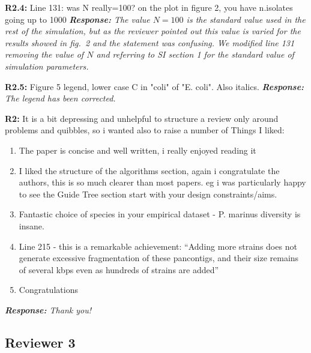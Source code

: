 \documentclass[aps,rmp,onecolumn]{revtex4-1}
\newcommand{\Marco}[1]{{\color{orange}Marco: #1}}
\newcommand{\reviewer}[2]{\textbf{#1:} #2\vskip 5mm}
\newcommand{\response}[1]{{\it {\color{response}\textbf{Response:} #1}}\vskip 5mm}
\begin{document}
\reviewer{R2.4}{Line 131: was N really=100? on the plot in figure 2, you have n.isolates going up to 1000}
\response{The value $N=100$ is the standard value used in the rest of the simulation, but as the reviewer pointed out this value is varied for the results showed in fig.~2 and the statement was confusing. We modified line 131 removing the value of $N$ and referring to SI section 1 for the standard value of simulation parameters.}

\reviewer{R2.5}{Figure 5 legend, lower case C in "coli" of "E. coli". Also italics.}
\response{The legend has been corrected.}


\reviewer{R2}{It is a bit depressing and unhelpful to structure a review only around problems and quibbles, so i wanted also to raise a number of
      Things I liked:

      \begin{enumerate}
            \item The paper is concise and well written, i really enjoyed reading it
            \item I liked the structure of the algorithms section, again i congratulate the authors, this is so much clearer than most papers. eg i was particularly happy to see the Guide Tree section start with your design constraints/aims.
            \item Fantastic choice of species in your empirical dataset - P. marinus diversity is insane.
            \item Line 215 - this is a remarkable achievement: ``Adding more strains does not generate excessive fragmentation of these pancontigs, and their size remains of several kbps even as hundreds of strains are added''
            \item Congratulations
      \end{enumerate}
}
\response{Thank you!}

\subsection*{Reviewer 3}
\end{document}
